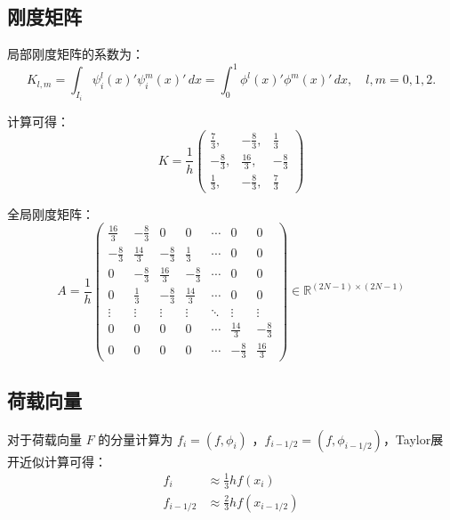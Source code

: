 \documentclass[11pt]{ctexart}
\begin{document}
\subsection{刚度矩阵}
局部刚度矩阵的系数为：
\begin{equation}
     K_{l,m}= \int_{I_i} \psi^l_i(x)'\psi^m_i(x)' \, dx = \int_{0}^{1} \phi^l(x)'\phi^m(x)' \, dx, \quad l,m = 0,1,2.
\end{equation}

计算可得：
\begin{equation}
     K =\frac{1}{h}
     \begin{pmatrix}
          \frac{7}{3}, & -\frac{8}{3}, & \frac{1}{3} \\
          -\frac{8}{3}, & \frac{16}{3}, & -\frac{8}{3} \\
          \frac{1}{3}, & -\frac{8}{3}, & \frac{7}{3}
     \end{pmatrix}
\end{equation}

全局刚度矩阵：
\begin{equation}
     A = \frac{1}{h}
     \begin{pmatrix}
          \frac{16}{3} & -\frac{8}{3} & 0 & 0 & \cdots & 0 & 0\\
          -\frac{8}{3} & \frac{14}{3} & -\frac{8}{3} &\frac{1}{3} &\cdots & 0 & 0\\
          0 & -\frac{8}{3} & \frac{16}{3} & -\frac{8}{3} & \cdots & 0 & 0\\
          0 & \frac{1}{3} & -\frac{8}{3} & \frac{14}{3} & \cdots & 0 & 0\\
          \vdots & \vdots & \vdots & \vdots & \ddots & \vdots & \vdots\\
          0 & 0 & 0 & 0 & \cdots & \frac{14}{3} & -\frac{8}{3}\\
          0 & 0 & 0 & 0 & \cdots & -\frac{8}{3} & \frac{16}{3}
     \end{pmatrix}
     \in \mathbb{R}^{(2N-1) \times (2N-1)}
\end{equation}

\subsection{荷载向量}
对于荷载向量 $ F $ 的分量计算为 $ f_i = (f,\phi_i) $ ，$ f_{i-1/2} = (f,\phi_{i-1/2}) $，Taylor展开近似计算可得：
\begin{equation}
     \begin{aligned}
          f_i &\approx \frac{1}{3} hf(x_i)\\
          f_{i-1/2} &\approx \frac{2}{3} hf(x_{i-1/2})
     \end{aligned}
\end{equation}
\end{document}
